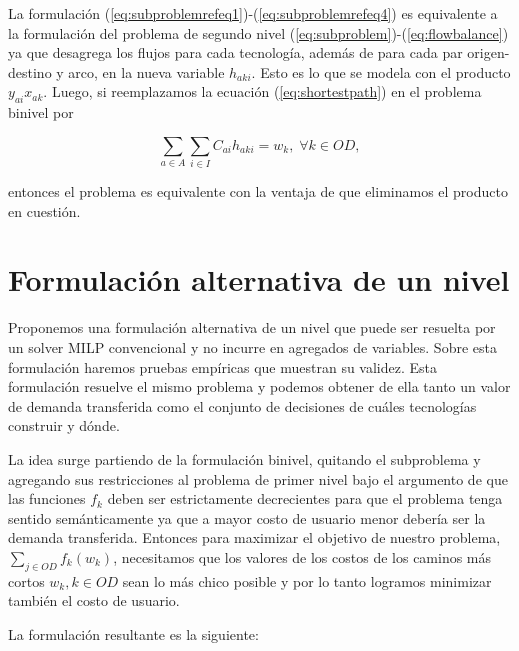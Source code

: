 La formulación (\ref{eq:subproblemrefeq1})-(\ref{eq:subproblemrefeq4}) es equivalente a la formulación del problema de segundo nivel (\ref{eq:subproblem})-(\ref{eq:flowbalance}) ya que desagrega los flujos para cada tecnología, además de para cada par origen-destino y arco, en la nueva variable $h_{aki}$. Esto es lo que se modela con el producto $y_{ai} x_{ak}$. Luego, si reemplazamos la ecuación (\ref{eq:shortestpath}) en el problema binivel por

\begin{equation*}
  \sum_{a \in A} \sum_{i \in I} C_{ai} h_{aki} = w_k,\; \forall k \in OD,
\end{equation*}

 entonces el problema es equivalente con la ventaja de que eliminamos el producto en cuestión.

\section{Formulación alternativa de un nivel}
\label{sect:singlelevelformulation}

Proponemos una formulación alternativa de un nivel que puede ser resuelta por un solver MILP convencional y no incurre en agregados de variables. Sobre esta formulación haremos pruebas empíricas que muestran su validez. Esta formulación resuelve el mismo problema y podemos obtener de ella tanto un valor de demanda transferida como el conjunto de decisiones de cuáles tecnologías construir y dónde.

La idea surge partiendo de la formulación binivel, quitando el subproblema y agregando sus restricciones al problema de primer nivel bajo el argumento de que las funciones $f_k$ deben ser estrictamente decrecientes para que el problema tenga sentido semánticamente ya que a mayor costo de usuario menor debería ser la demanda transferida. Entonces para maximizar el objetivo de nuestro problema, $\sum_{j \in OD}f_k(w_k)$, necesitamos que los valores de los costos de los caminos más cortos $w_k, k \in OD$ sean lo más chico posible y por lo tanto logramos minimizar también el costo de usuario.

La formulación resultante es la siguiente:

